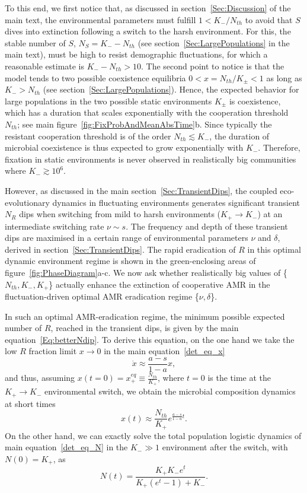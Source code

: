 \documentclass{article}
\begin{document}
To this end, we first notice that, as discussed in section~\ref{Sec:Discussion} of the main text, the environmental parameters must fulfill \(1<K_{-}/N_{th}\) to avoid that $S$ dives into extinction following a switch to the harsh environment. For this, the stable number of $S$, \(N_S=K_{-}-N_{th}\) (see section~\ref{Sec:LargePopulations} in the main text), must be high to resist demographic fluctuations, for which a reasonable estimate is \(K_{-}-N_{th}>10\). The second point to notice is that the model tends to two possible coexistence equilibria \(0<x=N_{th}/K_{\pm}<1\) as long as \(K_{-}>N_{th}\) (see section~\ref{Sec:LargePopulations}). Hence, the expected behavior for large populations in the two possible static environments \(K_{\pm}\) is coexistence, which has a duration that scales exponentially with the cooperation threshold \(N_{th}\); see main figure~\ref{fig:FixProbAndMeanAbsTime}b. Since typically the resistant cooperation threshold is of the order \(N_{th}\lesssim K_{-}\), the duration of microbial coexistence is thus expected to grow exponentially with \(K_{-}\). Therefore, fixation in static environments is never observed in realistically big communities where \(K_{-}\gtrsim10^{6}\). 

However, as discussed in the main section~\ref{Sec:TransientDips}, the coupled eco-evolutionary dynamics in fluctuating environments generates significant transient $N_R$ dips when switching from mild to harsh environments (\(K_{+}\rightarrow K_{-}\)) at an intermediate switching rate $\nu\sim s$. The frequency and depth of these transient dips are maximised in a certain range of environmental parameters \(\nu\) and \(\delta\), derived in section~\ref{Sec:TransientDips}. The rapid eradication of $R$ in this optimal dynamic environment regime is shown in the green-enclosing areas of figure~\ref{fig:PhaseDiagram}a-c. We now ask whether realistically big values of \{\(N_{th},K_{-},K_{+}\)\} actually enhance the extinction of cooperative AMR in the fluctuation-driven optimal AMR eradication regime \{\(\nu,\delta\)\}.

In such an optimal AMR-eradication regime, the minimum possible expected number of $R$, reached in the transient dips, is given by the main equation~\eqref{Eq:betterNdip}. To derive this equation, on the one hand we take the low $R$ fraction limit \(x\rightarrow0\) in the main equation~\eqref{det_eq_x} \[\dot{x}\approx\frac{a-s}{1-a}x,\] and thus, assuming \(x(t=0)=x^{eq}_+\equiv\frac{N_{th}}{K_{+}}\), where \(t=0\) is the time at the \(K_{+}\rightarrow K_{-}\) environmental switch, we obtain the microbial composition dynamics at short times \[x(t)\approx\frac{N_{th}}{K_{+}}e^{\frac{a-s}{1-a}t}.\] On the other hand, we can exactly solve the total population logistic dynamics of main equation~\eqref{det_eq_N} in the \(K_{-}\gg1\) environment after the switch, with \(N(0)=K_{+}\), as \[N\left(t\right)=\frac{K_{+}K_{-}e^{t}}{K_{+}\left(e^{t}-1\right)+K_{-}}.\]
\end{document}
